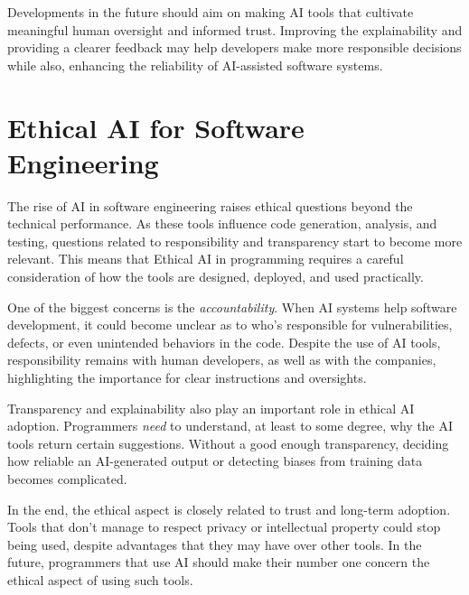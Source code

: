 Developments in the future should aim on making AI tools that cultivate meaningful human oversight and informed trust. Improving the explainability and providing a clearer feedback may help developers make more responsible decisions while also, enhancing the reliability of AI-assisted software systems.

\section{Ethical AI for Software Engineering}

The rise of AI in software engineering raises ethical questions beyond the technical performance. As these tools influence code generation, analysis, and testing, questions related to responsibility and transparency start to become more relevant. This means that Ethical AI in programming requires a careful consideration of how the tools are designed, deployed, and used practically.

One of the biggest concerns is the \textit{accountability}. When AI systems help software development, it could become unclear as to who's responsible for vulnerabilities, defects, or even unintended behaviors in the code. Despite the use of AI tools, responsibility remains with human developers, as well as with the companies, highlighting the importance for clear instructions and oversights.

Transparency and explainability also play an important role in ethical AI adoption. Programmers \textit{need} to understand, at least to some degree, why the AI tools return certain suggestions. Without a good enough transparency, deciding how reliable an AI-generated output or detecting biases from training data becomes complicated.

In the end, the ethical aspect is closely related to trust and long-term adoption. Tools that don't manage to respect privacy or intellectual property could stop being used, despite advantages that they may have over other tools. In the future, programmers that use AI should make their number one concern the ethical aspect of using such tools.

